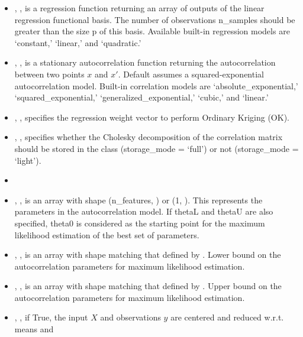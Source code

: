 \begin{itemize}
  \item {}, , is a regression
  function returning an array of outputs of the linear regression functional
  basis.
  The number of observations n\_samples should be greater than the size p of
  this basis.
  Available built-in regression models are `constant,' `linear,' and
  `quadratic.'
  \item {}, , is a stationary
  autocorrelation function returning the autocorrelation between two points $x$
  and $x'$.
  Default assumes a squared-exponential autocorrelation model.
  Built-in correlation models are `absolute\_exponential,'
  `squared\_exponential,' `generalized\_exponential,' `cubic,' and `linear.'
  \item {}, , specifies
  the regression weight vector to perform Ordinary Kriging (OK).
  \item {}, , specifies
  whether the Cholesky decomposition of the correlation matrix should be stored
  in the class (storage\_mode = `full') or not (storage\_mode = `light').
  \item {}
  \item {}, , is an
  array with shape (n\_features, ) or (1, ).
  This represents the parameters in the autocorrelation model.
  If thetaL and thetaU are also specified, theta0 is considered as the starting
  point for the maximum likelihood estimation of the best set of parameters.
  \item {}, , is an
  array with shape matching that defined by .
  Lower bound on the autocorrelation parameters for maximum likelihood
  estimation.
  \item {}, , is an
  array with shape matching that defined by .
  Upper bound on the autocorrelation parameters for maximum likelihood
  estimation.
  \item {}, , if True, the
  input $X$ and observations $y$ are centered and reduced w.r.t. means and

\end{itemize}

